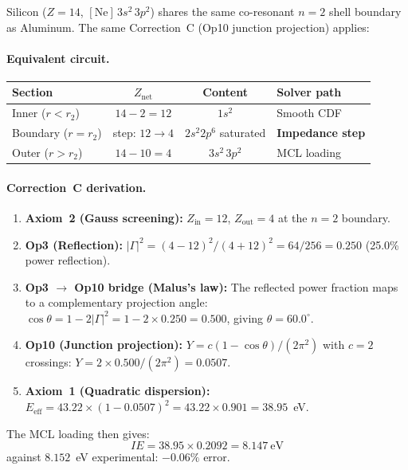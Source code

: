 Silicon ($Z = 14$, $[\text{Ne}]\,3s^2\,3p^2$) shares the same co-resonant $n = 2$ shell boundary as Aluminum.  The same Correction~C (Op10 junction projection) applies:

\paragraph{Equivalent circuit.}
\begin{center}
\small
\begin{tabularx}{\textwidth}{@{}lccX@{}}
\toprule
\textbf{Section} & \textbf{$Z_\text{net}$} & \textbf{Content} & \textbf{Solver path} \\
\midrule
Inner ($r < r_2$) & $14 - 2 = 12$ & $1s^2$ & Smooth CDF \\
Boundary ($r = r_2$) & step: $12 \to 4$ & $2s^2 2p^6$ saturated & \textbf{Impedance step} \\
Outer ($r > r_2$) & $14 - 10 = 4$ & $3s^2\,3p^2$ & MCL loading \\
\bottomrule
\end{tabularx}
\end{center}

\paragraph{Correction~C derivation.}
\begin{enumerate}
    \item \textbf{Axiom~2 (Gauss screening):}  $Z_\text{in} = 12$, $Z_\text{out} = 4$ at the $n = 2$ boundary.
    \item \textbf{Op3 (Reflection):}  $|\Gamma|^2 = (4-12)^2/(4+12)^2 = 64/256 = 0.250$ (25.0\% power reflection).
    \item \textbf{Op3 $\to$ Op10 bridge (Malus's law):}  The reflected power fraction maps to a complementary projection angle: $\cos\theta = 1 - 2|\Gamma|^2 = 1 - 2 \times 0.250 = 0.500$, giving $\theta = 60.0^\circ$.
    \item \textbf{Op10 (Junction projection):}  $Y = c(1 - \cos\theta)/(2\pi^2)$ with $c = 2$ crossings: $Y = 2 \times 0.500 / (2\pi^2) = 0.0507$.
    \item \textbf{Axiom~1 (Quadratic dispersion):}  $E_\text{eff} = 43.22 \times (1 - 0.0507)^2 = 43.22 \times 0.901 = 38.95$~eV.
\end{enumerate}

The MCL loading then gives:
\[
    IE = 38.95 \times 0.2092 = 8.147~\text{eV}
\]
against $8.152$~eV experimental: $\boxed{-0.06\%}$ error.

